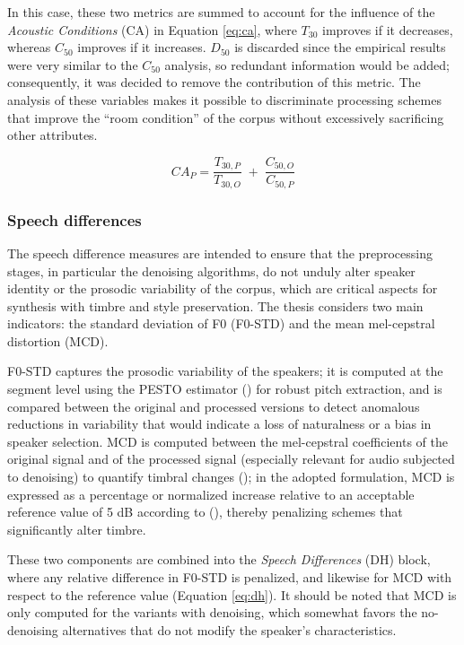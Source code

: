 In this case, these two metrics are summed to account for the influence of the \emph{Acoustic Conditions} (CA) in Equation \ref{eq:ca}, where $T_{30}$ improves if it decreases, whereas $C_{50}$ improves if it increases. $D_{50}$ is discarded since the empirical results were very similar to the $C_{50}$ analysis, so redundant information would be added; consequently, it was decided to remove the contribution of this metric. The analysis of these variables makes it possible to discriminate processing schemes that improve the ``room condition'' of the corpus without excessively sacrificing other attributes.

\begin{equation}
\label{eq:ca}
CA_P =
\frac{T_{30,P}}{T_{30,O}}
\;+\; \frac{C_{50,O}}{C_{50,P}}
\end{equation}

\subsubsection{Speech differences}
The speech difference measures are intended to ensure that the preprocessing stages, in particular the denoising algorithms, do not unduly alter speaker identity or the prosodic variability of the corpus, which are critical aspects for synthesis with timbre and style preservation. The thesis considers two main indicators: the standard deviation of F0 (F0-STD) and the mean mel-cepstral distortion (MCD).

F0-STD captures the prosodic variability of the speakers; it is computed at the segment level using the PESTO estimator (\cite{PESTO}) for robust pitch extraction, and is compared between the original and processed versions to detect anomalous reductions in variability that would indicate a loss of naturalness or a bias in speaker selection. MCD is computed between the mel-cepstral coefficients of the original signal and of the processed signal (especially relevant for audio subjected to denoising) to quantify timbral changes (\cite{mcd_metric}); in the adopted formulation, MCD is expressed as a percentage or normalized increase relative to an acceptable reference value of 5 dB according to (\cite{survey2}), thereby penalizing schemes that significantly alter timbre.

These two components are combined into the \emph{Speech Differences} (DH) block, where any relative difference in F0-STD is penalized, and likewise for MCD with respect to the reference value (Equation \ref{eq:dh}). It should be noted that MCD is only computed for the variants with denoising, which somewhat favors the no-denoising alternatives that do not modify the speaker's characteristics.

